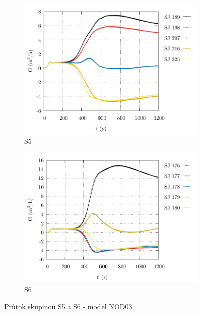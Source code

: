 \begin{figure}
	\centering
	\begin{subfigure}{0.5\textwidth}
		\centering
		\includegraphics[width=\textwidth, trim={0cm 0cm 0cm 0cm}, clip]{./05_TH_model_VR_1/grafy/G_time_nod_03_4.pdf}
		\caption{S5}
		\label{fig:g_time_nod_03_4_prilohy}
	\end{subfigure}%
	\hfill
	\begin{subfigure}{0.5\textwidth}
		\centering
		\includegraphics[width=\textwidth, trim={0cm 0cm 0cm 0cm}, clip]{./05_TH_model_VR_1/grafy/G_time_nod_03_5.pdf}
				\caption{S6}
		\label{fig:g_time_nod_03_5_prilohy}
	\end{subfigure}%
	\caption{Průtok skupinou S5 a S6 - model NOD03.}
\end{figure}

